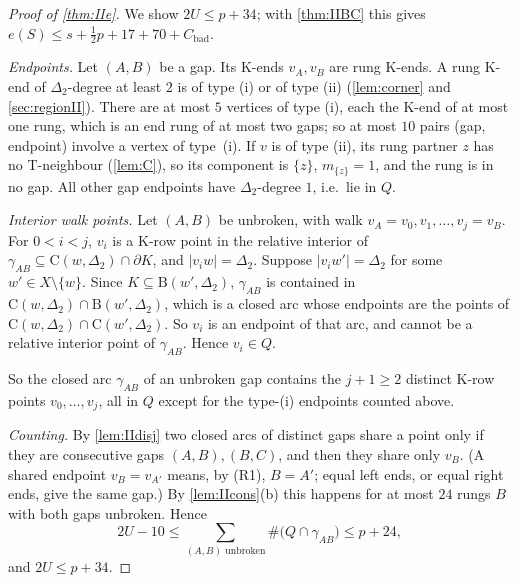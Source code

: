 \documentclass[11pt]{amsart}
\theoremstyle{definition}
\theoremstyle{remark}
\newcommand{\Dt}{\Delta_2}
\newcommand{\Cc}{\mathrm{C}}      %
\newcommand{\Dd}{\mathrm{B}}      %
\begin{document}
\begin{proof}[Proof of \cref{thm:IIe}]
We show $2U\le p+34$; with \cref{thm:IIBC} this gives $e(S)\le s+\frac12p+17+70+C_{\mathrm{bad}}$.

\emph{Endpoints.} Let $(A,B)$ be a gap. Its K-ends $v_A,v_B$ are rung K-ends. A rung K-end of $\Dt$-degree at least $2$ is of type (i) or of type (ii) (\cref{lem:corner} and \cref{sec:regionII}). There are at most $5$ vertices of type (i), each the K-end of at most one rung, which is an end rung of at most two gaps; so at most $10$ pairs (gap, endpoint) involve a vertex of type~(i). If $v$ is of type (ii), its rung partner $z$ has no T-neighbour (\cref{lem:C}), so its component is $\{z\}$, $m_{\{z\}}=1$, and the rung is in no gap. All other gap endpoints have $\Dt$-degree $1$, i.e.\ lie in $Q$.

\emph{Interior walk points.} Let $(A,B)$ be unbroken, with walk $v_A=v_0,v_1,\dots,v_j=v_B$. For $0<i<j$, $v_i$ is a K-row point in the relative interior of $\gamma_{AB}\subseteq\Cc(w,\Dt)\cap\partial K$, and $|v_iw|=\Dt$. Suppose $|v_iw'|=\Dt$ for some $w'\in X\setminus\{w\}$. Since $K\subseteq\Dd(w',\Dt)$, $\gamma_{AB}$ is contained in $\Cc(w,\Dt)\cap\Dd(w',\Dt)$, which is a closed arc whose endpoints are the points of $\Cc(w,\Dt)\cap\Cc(w',\Dt)$. So $v_i$ is an endpoint of that arc, and cannot be a relative interior point of $\gamma_{AB}$. Hence $v_i\in Q$.

So the closed arc $\gamma_{AB}$ of an unbroken gap contains the $j+1\ge2$ distinct K-row points $v_0,\dots,v_j$, all in $Q$ except for the type-(i) endpoints counted above.

\emph{Counting.} By \cref{lem:IIdisj} two closed arcs of distinct gaps share a point only if they are consecutive gaps $(A,B),(B,C)$, and then they share only $v_B$. (A shared endpoint $v_B=v_{A'}$ means, by (R1), $B=A'$; equal left ends, or equal right ends, give the same gap.) By \cref{lem:IIcons}(b) this happens for at most $24$ rungs $B$ with both gaps unbroken. Hence
\[
2U-10\le\sum_{(A,B)\text{ unbroken}}\#\bigl(Q\cap\gamma_{AB}\bigr)\le p+24,
\]
and $2U\le p+34$.
\end{proof}
\end{document}
